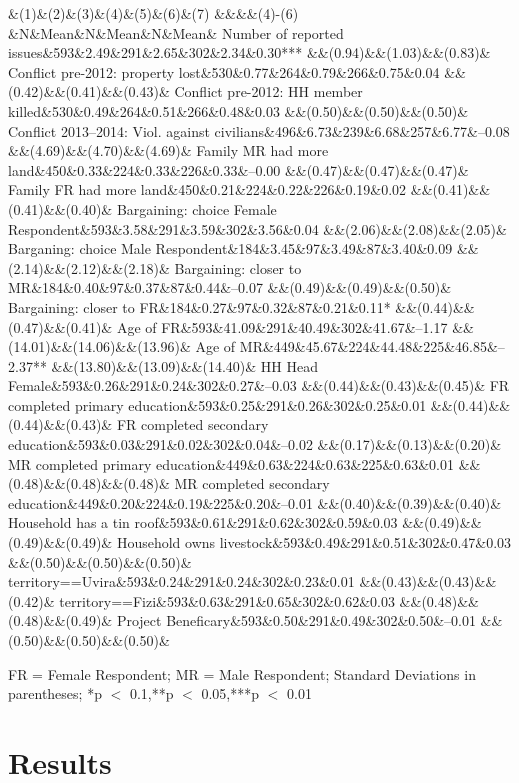 \documentclass[
]{article}
\begin{document}
\&(1)\&(2)\&(3)\&(4)\&(5)\&(6)\&(7) \&\&\&\&(4)-(6)
\&N\&Mean\&N\&Mean\&N\&Mean\& Number of reported
issues\&593\&2.49\&291\&2.65\&302\&2.34\&0.30***
\&\&(0.94)\&\&(1.03)\&\&(0.83)\& Conflict pre-2012: property
lost\&530\&0.77\&264\&0.79\&266\&0.75\&0.04
\&\&(0.42)\&\&(0.41)\&\&(0.43)\& Conflict pre-2012: HH member
killed\&530\&0.49\&264\&0.51\&266\&0.48\&0.03
\&\&(0.50)\&\&(0.50)\&\&(0.50)\& Conflict 2013--2014: Viol. against
civilians\&496\&6.73\&239\&6.68\&257\&6.77\&--0.08
\&\&(4.69)\&\&(4.70)\&\&(4.69)\& Family MR had more
land\&450\&0.33\&224\&0.33\&226\&0.33\&--0.00
\&\&(0.47)\&\&(0.47)\&\&(0.47)\& Family FR had more
land\&450\&0.21\&224\&0.22\&226\&0.19\&0.02
\&\&(0.41)\&\&(0.41)\&\&(0.40)\& Bargaining: choice Female
Respondent\&593\&3.58\&291\&3.59\&302\&3.56\&0.04
\&\&(2.06)\&\&(2.08)\&\&(2.05)\& Barganing: choice Male
Respondent\&184\&3.45\&97\&3.49\&87\&3.40\&0.09
\&\&(2.14)\&\&(2.12)\&\&(2.18)\& Bargaining: closer to
MR\&184\&0.40\&97\&0.37\&87\&0.44\&--0.07
\&\&(0.49)\&\&(0.49)\&\&(0.50)\& Bargaining: closer to
FR\&184\&0.27\&97\&0.32\&87\&0.21\&0.11*
\&\&(0.44)\&\&(0.47)\&\&(0.41)\& Age of
FR\&593\&41.09\&291\&40.49\&302\&41.67\&--1.17
\&\&(14.01)\&\&(14.06)\&\&(13.96)\& Age of
MR\&449\&45.67\&224\&44.48\&225\&46.85\&--2.37**
\&\&(13.80)\&\&(13.09)\&\&(14.40)\& HH Head
Female\&593\&0.26\&291\&0.24\&302\&0.27\&--0.03
\&\&(0.44)\&\&(0.43)\&\&(0.45)\& FR completed primary
education\&593\&0.25\&291\&0.26\&302\&0.25\&0.01
\&\&(0.44)\&\&(0.44)\&\&(0.43)\& FR completed secondary
education\&593\&0.03\&291\&0.02\&302\&0.04\&--0.02
\&\&(0.17)\&\&(0.13)\&\&(0.20)\& MR completed primary
education\&449\&0.63\&224\&0.63\&225\&0.63\&0.01
\&\&(0.48)\&\&(0.48)\&\&(0.48)\& MR completed secondary
education\&449\&0.20\&224\&0.19\&225\&0.20\&--0.01
\&\&(0.40)\&\&(0.39)\&\&(0.40)\& Household has a tin
roof\&593\&0.61\&291\&0.62\&302\&0.59\&0.03
\&\&(0.49)\&\&(0.49)\&\&(0.49)\& Household owns
livestock\&593\&0.49\&291\&0.51\&302\&0.47\&0.03
\&\&(0.50)\&\&(0.50)\&\&(0.50)\&
territory==Uvira\&593\&0.24\&291\&0.24\&302\&0.23\&0.01
\&\&(0.43)\&\&(0.43)\&\&(0.42)\&
territory==Fizi\&593\&0.63\&291\&0.65\&302\&0.62\&0.03
\&\&(0.48)\&\&(0.48)\&\&(0.49)\& Project
Beneficary\&593\&0.50\&291\&0.49\&302\&0.50\&--0.01
\&\&(0.50)\&\&(0.50)\&\&(0.50)\&

FR = Female Respondent; MR = Male Respondent; Standard Deviations in
parentheses; *p \(<\) 0.1,**p \(<\) 0.05,***p \(<\) 0.01

\section*{Results}\label{results}
\end{document}
